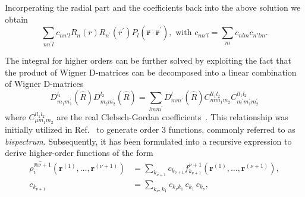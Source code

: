 Incorperating the radial part and the coefficients back into the above solution we obtain
\begin{equation}
  \label{eq:soap}
  \sum_{nn^\prime l} c_{nn'l} R_n(r)R_{n^\prime}(r^\prime) P_l(\hat{\mathbf{r}}\cdot\hat{\mathbf{r}}^\prime),\textrm{ with }c_{nn'l} = \sum_{m} c_{nlm}c_{n'lm}.
\end{equation}

The integral for higher orders can be further solved by exploiting the fact that the product of Wigner D-matrices can be decomposed into a linear combination of Wigner D-matrices
\begin{equation}
  \label{eq:clebsch-gordan}
  D^{l_1}_{m_1m_1^\prime}(\hat{R})D^{l_2}_{m_2m_2^\prime}(\hat{R}) = \sum_{l m m^\prime} D^{l}_{mm^\prime}(\hat{R}) C^{l l_1l_2}_{mm_1m_2}C^{l l_1l_2}_{m^\prime m_1^\prime m_2^\prime}
\end{equation}
where $C^{l l_1l_2}_{\mu m_1m_2}$ are the real Clebsch-Gordan coefficients~\cite{yutsis1965theory,nigam2020recursive}.
This relationship was initially utilized in Ref.~\cite{bartok2013representing} to generate order 3 functions, commonly referred to as \emph{bispectrum}.
Subsequently, it has been formulated into a recursive expression to derive higher-order functions of the form
\begin{subequations}
\label{eq:recursive_higherorder}
\begin{align}
  \overline{\rho_i^{\otimes\nu+1}}(\mathbf{r}^{(1)}, \ldots, \mathbf{r}^{(\nu+1)}) &= \sum_{k_{\nu+1}} c_{k_{\nu+1}} f^{\nu+1}_{k_{\nu+1}}(\mathbf{r}^{(1)}, \ldots, \mathbf{r}^{(\nu+1)}), \\
  c_{k_{\nu+1}} &= \sum_{k_\nu, k_1} c_{k_\nu k_1}\, c_{k_1}\, c_{k_\nu},
\end{align}
\end{subequations}
